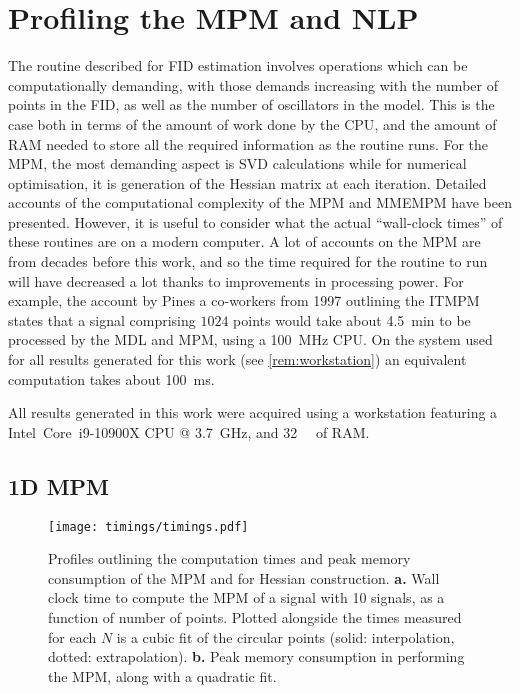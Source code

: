 \section{Profiling the \acs{MPM} and \acs{NLP}}
\label{sec:profiling}
The routine described for \ac{FID} estimation involves operations which can be
computationally demanding, with those demands increasing with the number of
points in the \ac{FID}, as well as the number of oscillators in the model. This
is the case both in terms of the amount of work
done by the \ac{CPU}, and the amount of \ac{RAM} needed to store all the
required information as the routine runs. For the \ac{MPM}, the most
demanding aspect is \ac{SVD} calculations while for numerical optimisation, it
is generation of the Hessian matrix at each iteration. Detailed accounts of the
computational complexity of the \ac{MPM} and \ac{MMEMPM} have been
presented\cite{Hua1992,Chen2007}.  However, it is useful to consider what the
actual ``wall-clock times'' of these routines are on a modern computer. A lot of
accounts on the \ac{MPM} are from decades before this work, and so the
time required for the routine to run will have decreased a lot thanks to
improvements in processing power. For example, the account by Pines a co-workers
from 1997 outlining the \ac{ITMPM} states that a signal comprising $1024$
points would take about
\qty{4.5}{\minute} to be processed by the \ac{MDL} and \ac{MPM}, using a
\qty{100}{\mega\hertz} \ac{CPU}\cite{Lin1997}. On the system used for all
results generated for this work (see \cref{rem:workstation}) an
equivalent computation takes about \qty{100}{\milli\second}.
\begin{remark}
    \label{rem:workstation}
    All results generated in this work were acquired using a workstation
    featuring a Intel\textregistered\ Core\texttrademark\ i9-10900X CPU @
    \qty{3.7}{\giga\hertz}, and \qty{32}{\gibi\byte} of RAM.
\end{remark}

\subsection{\acs{1D} \acs{MPM}}
\begin{figure}
    \texttt{[image: timings/timings.pdf]}
    \caption[
        Profiles outlining the computation times and peak memory consumption of
        the \acs{MPM} and for Hessian construction.
    ]
    {
        Profiles outlining the computation times and peak memory consumption of
        the \acs{MPM} and for Hessian construction.
        \textbf{a.} Wall clock time to compute the \ac{MPM} of a signal
        with 10 signals, as a function of number of points. Plotted alongside
        the times measured for each $N$ is a cubic fit of the circular points
        (solid: interpolation, dotted: extrapolation).
        \textbf{b.} Peak memory consumption in performing the \ac{MPM}, along
        with a quadratic fit.
    }
    \label{fig:profiling}
\end{figure}

